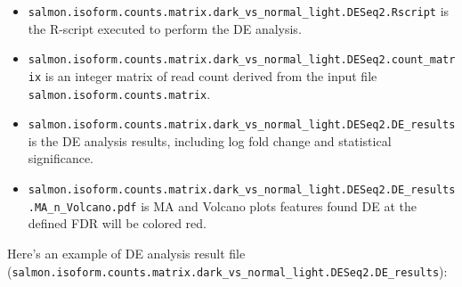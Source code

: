 \documentclass[
  letterpaper,
  DIV=11,
  numbers=noendperiod]{scrreprt}
\begin{document}
\begin{itemize}
\item
  \texttt{salmon.isoform.counts.matrix.dark\_vs\_normal\_light.DESeq2.Rscript}
  is the R-script executed to perform the DE analysis.
\item
  \texttt{salmon.isoform.counts.matrix.dark\_vs\_normal\_light.DESeq2.count\_matrix}
  is an integer matrix of read count derived from the input file
  \texttt{salmon.isoform.counts.matrix}.
\item
  \texttt{salmon.isoform.counts.matrix.dark\_vs\_normal\_light.DESeq2.DE\_results}
  is the DE analysis results, including log fold change and statistical
  significance.
\item
  \texttt{salmon.isoform.counts.matrix.dark\_vs\_normal\_light.DESeq2.DE\_results.MA\_n\_Volcano.pdf}
  is MA and Volcano plots features found DE at the defined FDR will be
  colored red.
\end{itemize}

Here's an example of DE analysis result file
(\texttt{salmon.isoform.counts.matrix.dark\_vs\_normal\_light.DESeq2.DE\_results}):
\end{document}
